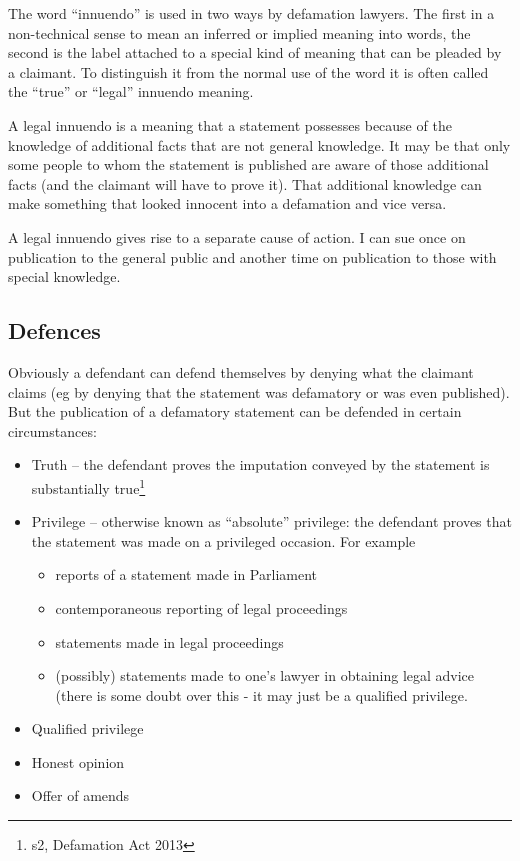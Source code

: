 \documentclass[]{article}
\begin{document}
The word ``innuendo'' is used in two ways by defamation lawyers. The
first in a non-technical sense to mean an inferred or implied meaning
into words, the second is the label attached to a special kind of
meaning that can be pleaded by a claimant. To distinguish it from the
normal use of the word it is often called the ``true'' or ``legal''
innuendo meaning.

A legal innuendo is a meaning that a statement possesses because of the
knowledge of additional facts that are not general knowledge. It may be
that only some people to whom the statement is published are aware of
those additional facts (and the claimant will have to prove it). That
additional knowledge can make something that looked innocent into a
defamation and vice versa.

A legal innuendo gives rise to a separate cause of action. I can sue
once on publication to the general public and another time on
publication to those with special knowledge.

\subsection{Defences}

Obviously a defendant can defend themselves by denying what the claimant
claims (eg by denying that the statement was defamatory or was even
published). But the publication of a defamatory statement can be defended in certain circumstances:

\begin{itemize}
\item
  Truth -- the defendant proves the imputation conveyed by the statement is substantially true\footnote{s2, Defamation Act 2013}
\item
  Privilege -- otherwise known as ``absolute'' privilege: the defendant
  proves that the statement was made on a privileged occasion. For
  example

  \begin{itemize}
  \item
    reports of a statement made in Parliament
  \item
    contemporaneous reporting of legal proceedings
  \item
    statements made in legal proceedings
  \item
    (possibly) statements made to one's lawyer in obtaining legal advice
    (there is some doubt over this - it may just be a qualified
    privilege.
  \end{itemize}
\item
  Qualified privilege
\item Honest opinion
\item
  Offer of amends
\end{itemize}
\end{document}
